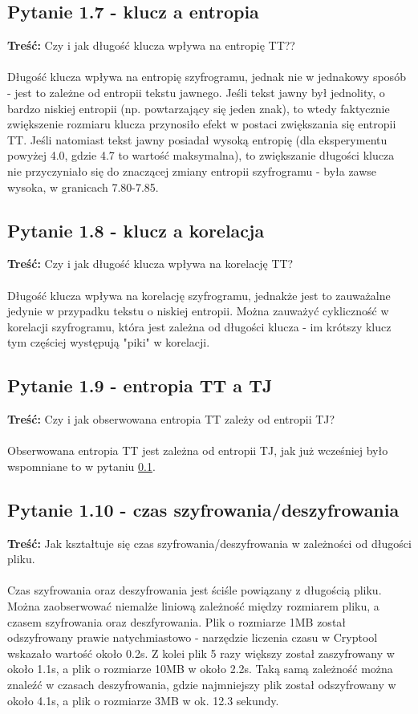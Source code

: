 \documentclass{article}
\begin{document}
\subsection{Pytanie 1.7 - klucz a entropia} \label{section:pytanie 1.7}
\textbf{Treść: } Czy i jak długość klucza wpływa na entropię TT?? \\\\
Długość klucza wpływa na entropię szyfrogramu, jednak nie w jednakowy sposób - jest to zależne od entropii tekstu jawnego.
Jeśli tekst jawny był jednolity, o bardzo niskiej entropii (np. powtarzający się jeden znak), to wtedy faktycznie zwiększenie rozmiaru klucza
przynosiło efekt w postaci zwiększania się entropii TT. Jeśli natomiast tekst jawny posiadał wysoką entropię (dla eksperymentu powyżej 4.0, gdzie 4.7 to wartość maksymalna),
to zwiększanie długości klucza nie przyczyniało się do znaczącej zmiany entropii szyfrogramu - była zawse wysoka, w granicach 7.80-7.85.
\subsection{Pytanie 1.8 - klucz a korelacja}
\textbf{Treść: } Czy i jak długość klucza wpływa na korelację TT?\\\\
Długość klucza wpływa na korelację szyfrogramu, jednakże jest to zauważalne jedynie w przypadku tekstu o niskiej entropii.
Można zauważyć cykliczność w korelacji szyfrogramu, która jest zależna od długości klucza - im krótszy klucz tym częściej występują "piki" w korelacji.
\subsection{Pytanie 1.9 - entropia TT a TJ}
\textbf{Treść: } Czy i jak obserwowana entropia TT zależy od entropii TJ? \\\\
Obserwowana entropia TT jest zależna od entropii TJ, jak już wcześniej było wspomniane to w pytaniu \ref{section:pytanie 1.7}.
\subsection{Pytanie 1.10 - czas szyfrowania/deszyfrowania}
\textbf{Treść: } Jak kształtuje się czas szyfrowania/deszyfrowania w zależności od długości pliku.\\\\
Czas szyfrowania oraz deszyfrowania jest ściśle powiązany z długością pliku. Można zaobserwować niemalże liniową zależność między rozmiarem pliku, a czasem szyfrowania oraz deszfyrowania.
Plik o rozmiarze 1MB został odszyfrowany prawie natychmiastowo - narzędzie liczenia czasu w Cryptool wskazało wartość około 0.2s. Z kolei plik 5 razy większy został zaszyfrowany w około 1.1s, a plik o rozmiarze 10MB w około 2.2s.
Taką samą zależność można znaleźć w czasach deszyfrowania, gdzie najmniejszy plik został odszyfrowany w około 4.1s, a plik o rozmiarze 3MB w ok. 12.3 sekundy.
\end{document}
